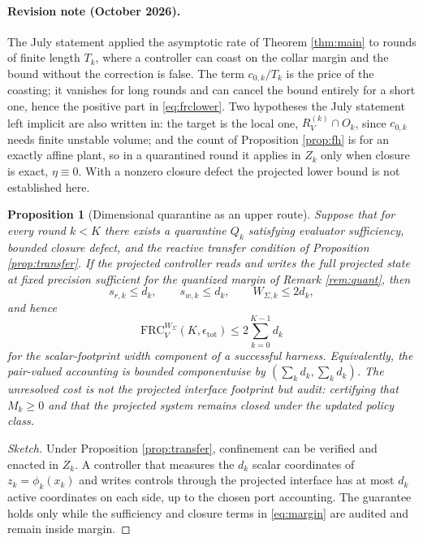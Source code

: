 \documentclass[11pt]{article}
\newtheorem{proposition}{Proposition}[section]
\theoremstyle{definition}
\theoremstyle{remark}
\newcommand{\W}{W}
\begin{document}
\paragraph{Revision note (October 2026).} The July statement applied the asymptotic rate of Theorem \ref{thm:main} to rounds of finite length $T_k$, where a controller can coast on the collar margin and the bound without the correction is false. The term $c_{0,k}/T_k$ is the price of the coasting; it vanishes for long rounds and can cancel the bound entirely for a short one, hence the positive part in \eqref{eq:frclower}. Two hypotheses the July statement left implicit are also written in: the target is the local one, $R^{(k)}_V\cap O_k$, since $c_{0,k}$ needs finite unstable volume; and the count of Proposition \ref{prop:fh} is for an exactly affine plant, so in a quarantined round it applies in $Z_k$ only when closure is exact, $\eta\equiv0$. With a nonzero closure defect the projected lower bound is not established here.

\begin{proposition}[Dimensional quarantine as an upper route]\label{prop:upper}
Suppose that for every round $k<K$ there exists a quarantine $Q_k$ satisfying evaluator sufficiency, bounded closure defect, and the reactive transfer condition of Proposition \ref{prop:transfer}. If the projected controller reads and writes the full projected state at fixed precision sufficient for the quantized margin of Remark \ref{rem:quant}, then
\begin{equation}
s_{r,k}\le d_k,\qquad s_{w,k}\le d_k,\qquad \W_{\Sigma,k}\le2d_k,
\end{equation}
and hence
\begin{equation}
\mathrm{FRC}^{\W_\Sigma}_V(K,\epsilon_{\mathrm{tot}})\le2\sum_{k=0}^{K-1}d_k
\end{equation}
for the scalar-footprint width component of a successful harness. Equivalently, the pair-valued accounting is bounded componentwise by $(\sum_kd_k,\sum_kd_k)$. The unresolved cost is not the projected interface footprint but audit: certifying that $M_k\ge0$ and that the projected system remains closed under the updated policy class.
\end{proposition}
\begin{proof}[Sketch]
Under Proposition \ref{prop:transfer}, confinement can be verified and enacted in $Z_k$. A controller that measures the $d_k$ scalar coordinates of $z_k=\phi_k(x_k)$ and writes controls through the projected interface has at most $d_k$ active coordinates on each side, up to the chosen port accounting. The guarantee holds only while the sufficiency and closure terms in \eqref{eq:margin} are audited and remain inside margin.
\end{proof}
\end{document}
